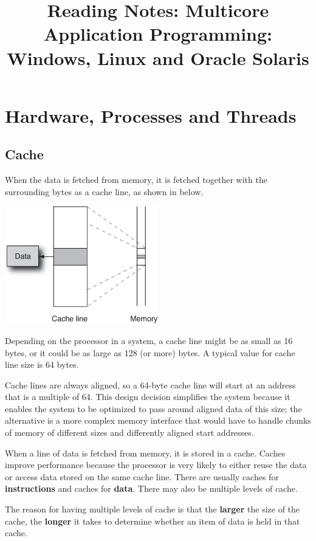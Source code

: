 \documentclass[12pt,a4paper]{report}
\title{Reading Notes: Multicore Application Programming: Windows, Linux and Oracle Solaris}
\begin{document}
\maketitle

\chapter{Hardware, Processes and Threads}
\section{Cache}
 When the data is fetched from memory, it is fetched together with the surrounding bytes as a cache line, as shown in below. 
 \begin{center}
 	\includegraphics{multicore_cache_line_from_memory.jpg}
 \end{center}
 Depending on the processor in a system, a cache line might be as small as 16 bytes, or it could be as large as 128 (or more) bytes. A typical value for cache line size is 64 bytes.
 \par
 Cache lines are always aligned, so a 64-byte cache line will start at an address that is a multiple of 64. This design decision simplifies the system because it enables the system to be optimized to pass around aligned data of this size; the alternative is a more complex memory interface that would have to handle chunks of memory of different sizes and differently aligned start addresses.
 \par
 When a line of data is fetched from memory, it is stored in a cache. Caches improve performance because the processor is very likely to either reuse the data or access data stored on the same cache line. There are usually caches for \textbf{instructions} and caches for \textbf{data}. There may also be multiple levels of cache.
 \par
 The reason for having multiple levels of cache is that the \textbf{larger} the size of the cache, the \textbf{longer} it takes to determine whether an item of data is held in that cache.
\end{document}
